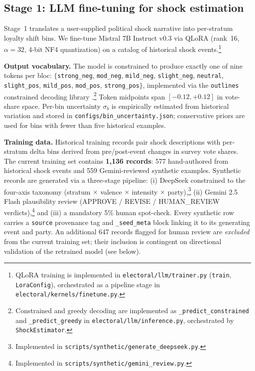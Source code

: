 \documentclass[12pt, letterpaper]{article}
\theoremstyle{definition}
\begin{document}
\subsection{Stage 1: LLM fine-tuning for shock estimation}
\label{sec:llm}

Stage~1 translates a user-supplied political shock narrative into per-stratum
loyalty shift bins. We fine-tune Mistral 7B Instruct v0.3 \citep{Jiang2023}
via QLoRA (rank~16, $\alpha = 32$, 4-bit NF4 quantization) on a catalog of
historical shock events.\footnote{QLoRA training is implemented in
\texttt{electoral/llm/trainer.py} (\texttt{train}, \texttt{LoraConfig}),
orchestrated as a pipeline stage in \texttt{electoral/kernels/finetune.py}.}

\textbf{Output vocabulary.} The model is constrained to produce exactly one of
nine tokens per bloc:
$\{$\texttt{strong\_neg}, \texttt{mod\_neg}, \texttt{mild\_neg},
\texttt{slight\_neg}, \texttt{neutral}, \texttt{slight\_pos},
\texttt{mild\_pos}, \texttt{mod\_pos}, \texttt{strong\_pos}$\}$,
implemented via the \texttt{outlines} constrained decoding library
\citep{Willard2023}.\footnote{Constrained and greedy decoding are implemented
as \texttt{\_predict\_constrained} and \texttt{\_predict\_greedy} in
\texttt{electoral/llm/inference.py}, orchestrated by \texttt{ShockEstimator}.}
Token midpoints span $[-0.12, +0.12]$ in vote-share
space. Per-bin uncertainty $\sigma_b$ is empirically estimated from
historical variation and stored in \texttt{configs/bin\_uncertainty.json};
conservative priors are used for bins with fewer than five historical examples.

\textbf{Training data.} Historical training records pair shock descriptions with
per-stratum delta bins derived from pre/post-event changes in survey vote
shares. The current training set contains \textbf{1,136 records}: 577 hand-authored
from historical shock events and 559 Gemini-reviewed synthetic examples. Synthetic
records are generated via a three-stage pipeline: (i) DeepSeek constrained to
the four-axis taxonomy (stratum $\times$ valence $\times$ intensity $\times$
party),\footnote{Implemented in \texttt{scripts/synthetic/generate\_deepseek.py}.}
(ii) Gemini 2.5 Flash plausibility review (APPROVE / REVISE / HUMAN\_REVIEW
verdicts),\footnote{Implemented in \texttt{scripts/synthetic/gemini\_review.py}.}
and (iii) a mandatory 5\% human spot-check. Every synthetic row carries
a \texttt{source} provenance tag and \texttt{\_seed\_meta} block linking it to its
generating event and party. An additional 647 records flagged for human review are
\emph{excluded} from the current training set; their inclusion is contingent on
directional validation of the retrained model (see below).
\end{document}
